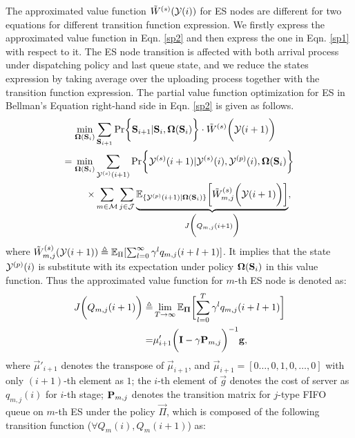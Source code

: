 The approximated value function $\tilde{W}^{(s)}(\mathcal{Y}(i))$ for ES nodes are different for two equations for different transition function expression.
We firstly express the approximated value function in Eqn. \ref{sp2} and then express the one in Eqn. \ref{sp1} with respect to it.
The ES node transition is affected with both arrival process under dispatching policy and last queue state, and we reduce the states expression by taking average over the uploading process together with the transition function expression.
The partial value function optimization for ES in Bellman's Equation right-hand side in Eqn. \ref{sp2} is given as follows.
\begin{align}
    \min_{\Policy(\Stat_i)}& \sum_{\Stat_{i+1}}
        \Pr\Brace{\Stat_{i+1}|\Stat_{i}, \Policy(\Stat_i)} \cdot \tilde{W}^{(s)}\Paren{\Obsv(i+1)}
            \nonumber\\
            = \min_{\Policy(\Stat_i)}& \sum_{\Obsv^{(s)}(i+1)}
                \Pr\Brace{\Obsv^{(s)}(i+1)|\Obsv^{(s)}(i), \Obsv^{(p)}(i), \Policy(\Stat_i)}
                \nonumber\\
                \times& \sum_{m\in\esSet} \sum_{j\in\jSpace}
                    \underbrace{
                        \mathbb{E}_{\set{\Obsv^{(p)}(i+1)|\Policy(\Stat_i)}} \Bracket{\tilde{W}^{(s)}_{m,j}\Paren{\Obsv(i+1)}}
                    }_{
                        J\Paren{Q_{m,j}(i+1)}
                    },
        \end{align}
        where $\tilde{W}^{(s)}_{m,j}(\mathcal{Y}(i+1)) \triangleq \mathbb{E}_{\Pi}[\sum_{l=0}^{\infty} \gamma^{l} q_{m,j}(i+l+1)]$. It implies that the state $\mathcal{Y}^{(p)}(i)$ is substitute with its expectation under policy $\boldsymbol{\Omega}(\mathbf{S}_i)$ in this value function.
        Thus the approximated value function for $m$-th ES node is denoted as:
        \begin{align}
            J\Paren{Q_{m,j}(i+1)} \define& \lim_{T\to\infty}
                \mathbb{E}_{\vec{\Pi}} \Bracket{\sum_{l=0}^{T} \gamma^{l} q_{m,j}(i+l+1)}
            \nonumber\\
            =& \vec{\mu}'_{i+1} \Paren{ \mat{I}-\gamma\mat{P}_{m,j} }^{-1} \vec{g},
        \end{align}
        where $\vec{\mu}'_{i+1}$ denotes the transpose of $\vec{\mu}_{i+1}$, and $\vec{\mu}_{i+1} = [0\dots,0,1,0,\dots,0]$ with only $(i+1)$-th element as $1$; the $i$-th element of $\vec{g}$ denotes the cost of server as $q_{m,j}(i)$ for $i$-th stage; $\mathbf{P}_{m,j}$ denotes the transition matrix for $j$-type FIFO queue on $m$-th ES under the policy $\vec{\Pi}$, which is composed of the following transition function ($\forall Q_m(i),Q_m(i+1)$) as:

